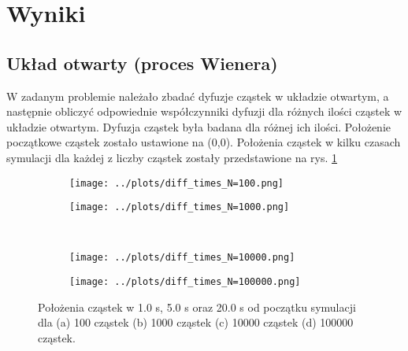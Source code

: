 \documentclass[a4paper, 12pt]{article}
\begin{document}
	\newpage
	
	\section*{Wyniki}
	
	\subsection*{Układ otwarty (proces Wienera)}
	
	W zadanym problemie należało zbadać dyfuzje cząstek w układzie otwartym, a następnie obliczyć odpowiednie współczynniki dyfuzji dla różnych ilości cząstek w układzie otwartym.
	Dyfuzja cząstek była badana dla różnej ich ilości. Położenie początkowe cząstek zostało ustawione na (0,0).
	Położenia cząstek w kilku czasach symulacji dla każdej z liczby cząstek zostały przedstawione na rys. \ref{1_loc}
	
	\begin{figure}[H]
		\centering
		\begin{subfigure}{0.49\textwidth}
			\centering
			\texttt{[image: ../plots/diff\_times\_N=100.png]}
			\caption{}
		\end{subfigure}
		\begin{subfigure}{0.49\textwidth}
			\centering
			\texttt{[image: ../plots/diff\_times\_N=1000.png]}
			\caption{}
		\end{subfigure}
		\\
		\begin{subfigure}{0.49\textwidth}
			\centering
			\texttt{[image: ../plots/diff\_times\_N=10000.png]}
			\caption{}
		\end{subfigure}
		\begin{subfigure}{0.49\textwidth}
			\centering
			\texttt{[image: ../plots/diff\_times\_N=100000.png]}
			\caption{}
		\end{subfigure}
		\caption{Położenia cząstek w 1.0 s, 5.0 s oraz 20.0 s od początku symulacji dla (a) 100 cząstek (b) 1000 cząstek (c) 10000 cząstek (d) 100000 cząstek.}
		\label{1_loc}
	\end{figure}
	
\end{document}
